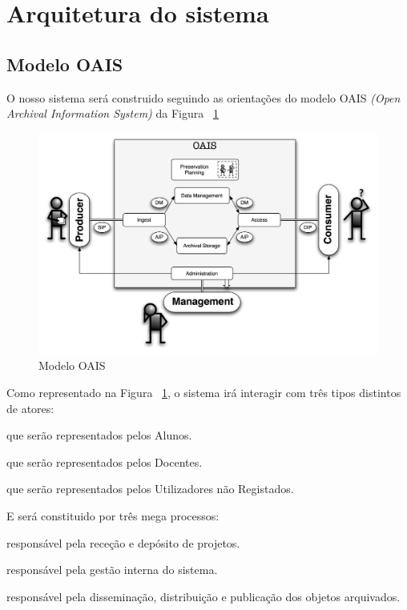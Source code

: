 \section{Arquitetura do sistema}
\subsection{Modelo OAIS}
O nosso sistema será construido seguindo as orientações do modelo OAIS \textit{(Open Archival Information System)} da Figura ~\ref{fig:oais}

\begin{figure}[H] 
  \centering
  \includegraphics[width=1\textwidth,center]{images/arquitetura/oais}
  \caption{Modelo OAIS}
  \label{fig:oais}
\end{figure}

Como representado na Figura ~\ref{fig:oais}, o sistema irá interagir com três tipos distintos de atores:
\begin{description}[labelindent=1cm]
  \item[Produtores] que serão representados pelos Alunos.
  \item[Administrador] que serão representados pelos Docentes.
  \item[Consumidor] que serão representados pelos Utilizadores não Registados.
\end{description}
E será constituido por três mega processos:
\begin{description}[labelindent=1cm]
  \item[Ingestão] responsável pela receção e depósito de projetos.
  \item[Administração] responsável pela gestão interna do sistema.
  \item[Disseminação] responsável pela disseminação, distribuição e publicação dos objetos arquivados.
\end{description}

